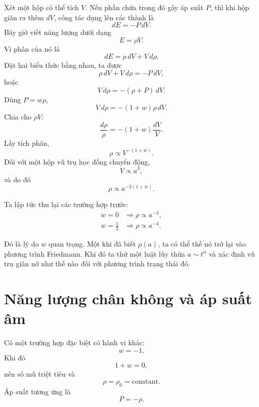 Xét một hộp có thể tích \(V\). Nếu phần chứa trong đó gây áp suất \(P\), thì khi hộp giãn ra thêm \(dV\), công tác dụng lên các thành là
\begin{equation}
dE=-P\,dV.
\end{equation}
Bây giờ viết năng lượng dưới dạng
\begin{equation}
E=\rho V.
\end{equation}
Vi phân của nó là
\begin{equation}
dE=\rho\,dV+V\,d\rho .
\end{equation}
Đặt hai biểu thức bằng nhau, ta được
\begin{equation}
\rho\,dV+V\,d\rho=-P\,dV,
\end{equation}
hoặc
\begin{equation}
V\,d\rho=-(\rho+P)\,dV.
\end{equation}
Dùng \(P=w\rho\),
\begin{equation}
V\,d\rho=-(1+w)\rho\,dV.
\end{equation}
Chia cho \(\rho V\):
\begin{equation}
\frac{d\rho}{\rho}=-(1+w)\frac{dV}{V}.
\end{equation}
Lấy tích phân,
\begin{equation}
\rho \propto V^{-(1+w)}.
\end{equation}
Đối với một hộp vũ trụ học đồng chuyển động,
\begin{equation}
V\propto a^3,
\end{equation}
và do đó
\begin{equation}
\rho \propto a^{-3(1+w)}.
\end{equation}

Ta lập tức thu lại các trường hợp trước:
\begin{align}
w=0 &\Longrightarrow \rho \propto a^{-3},\\
w=\frac{1}{3} &\Longrightarrow \rho \propto a^{-4}.
\end{align}

Đó là lý do \(w\) quan trọng. Một khi đã biết \(\rho(a)\), ta có thể thế nó trở lại vào phương trình Friedmann. Khi đó ta thử một luật lũy thừa \(a\sim t^\alpha\) và xác định vũ trụ giãn nở như thế nào đối với phương trình trạng thái đó.

\section{Năng lượng chân không và áp suất âm}

Có một trường hợp đặc biệt có hành vi khác:
\begin{equation}
w=-1.
\end{equation}
Khi đó
\begin{equation}
1+w=0,
\end{equation}
nên số mũ triệt tiêu và
\begin{equation}
\rho=\rho_0=\text{constant}.
\end{equation}
Áp suất tương ứng là
\begin{equation}
P=-\rho .
\end{equation}

